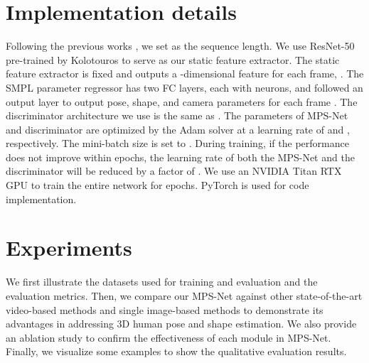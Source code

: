 \documentclass[10pt,twocolumn,letterpaper]{article}
\begin{document}
\vspace{-1pt}
\section{Implementation details}\vspace{-4pt}



Following the previous works \cite{Kocabas2020VIBEVI,choi2020beyond}, we set  as the sequence length. 
We use ResNet-50 \cite{He2016DeepRL} pre-trained by Kolotouros \etal \cite{Kolotouros2019LearningTR} to serve as our static feature extractor. The static feature extractor is fixed and outputs a -dimensional feature for each frame, \ie  . The SMPL parameter regressor has two FC layers, each with  neurons, and followed an output layer to output  pose, shape, and camera parameters  for each frame \cite{hmrKanazawa17, Kolotouros2019LearningTR}. The discriminator architecture we use is the same as \cite{Kocabas2020VIBEVI}. The parameters of MPS-Net and discriminator are optimized by the Adam solver \cite{Kingma2015AdamAM} at a learning rate of  and , respectively. The mini-batch size is set to . During training, if the performance does not improve within  epochs, the learning rate of both the MPS-Net and the discriminator will be reduced by a factor of . We use an NVIDIA Titan RTX GPU to train the entire network for  epochs. PyTorch \cite{pytorch} is used for code implementation.\vspace{-5pt}

\section{Experiments}\vspace{-4pt}

We first illustrate the datasets used for training and evaluation and the evaluation metrics. Then, we compare our MPS-Net against other state-of-the-art video-based methods and single image-based methods to demonstrate its advantages in addressing 3D human pose and shape estimation. We also provide an ablation study to confirm the effectiveness of each module in MPS-Net. Finally, we visualize some examples to show the qualitative evaluation results.
\end{document}
